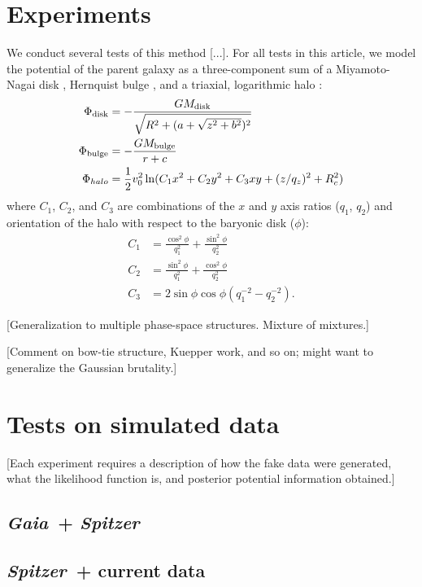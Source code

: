 \documentclass[letterpaper,12pt,preprint]{aastex}
\newcommand{\project}[1]{\textsl{#1}}
\newcommand{\gaia}{\project{Gaia}~}
\newcommand{\spitzer}{\project{Spitzer}~}
\begin{document}
\section{Experiments}
We conduct several tests of this method [...]. For all tests in this article, we model the potential of the parent galaxy as a three-component sum of a Miyamoto-Nagai disk \citep{}, Hernquist bulge \citep{}, and a triaxial, logarithmic halo \citep[e.g.,][]{law10}:
\begin{align}
	\Phi_{\rm disk} &= -\frac{GM_{\rm disk}}{\sqrt{R^2 + (a + \sqrt{z^2 + b^2})^2}}\\
	\Phi_{\rm bulge} &= -\frac{GM_{\rm bulge}}{r + c}\\
	\Phi_{halo} &= \frac{1}{2}v_{0}^2 \ln(C_1 x^2 + C_2 y^2 + C_3 xy + (z/q_z)^2 + R_c^2)
\end{align}
where $C_1$, $C_2$, and $C_3$ are combinations of the $x$ and $y$ axis
ratios ($q_1$, $q_2$) and orientation of the halo with respect to the
baryonic disk ($\phi$):
\begin{align}
  C_1 &= \frac{\cos^2\phi}{q_1^2} + \frac{\sin^2\phi}{q_2^2}\\
  C_2 &= \frac{\sin^2\phi}{q_1^2} + \frac{\cos^2\phi}{q_2^2}\\
  C_3 &= 2\sin\phi\cos\phi \left(q_1^{-2} - q_2^{-2}\right).
\end{align}


[Generalization to multiple phase-space structures. Mixture of
  mixtures.]

[Comment on bow-tie structure, Kuepper work, and so on;
  might want to generalize the Gaussian brutality.]

\section{Tests on simulated data}

[Each experiment requires a description of how the fake data were
  generated, what the likelihood function is, and posterior potential
  information obtained.]

\subsection{\gaia + \spitzer}

\subsection{\spitzer + current data}
\end{document}
